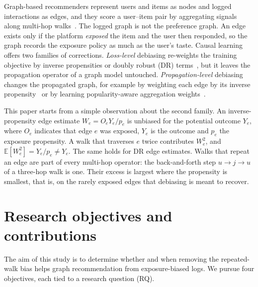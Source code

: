\documentclass[preprint,review,12pt,authoryear]{elsarticle}
\theoremstyle{definition}
\newcommand{\E}{\mathbb{E}}
\begin{document}
Graph-based recommenders represent users and items as nodes and logged
interactions as edges, and they score a user--item pair by aggregating signals
along multi-hop walks~\citep{he2020lightgcn,shen2021gfcf}. The logged graph is
not the preference graph. An edge exists only if the platform \emph{exposed}
the item and the user then responded, so the graph records the exposure policy
as much as the user's taste. Causal learning offers two families of
corrections. \emph{Loss-level} debiasing re-weights the training objective by
inverse propensities or doubly robust (DR)
terms~\citep{schnabel2016,wang2019drjl,saito2020unbiased}, but it leaves the
propagation operator of a graph model untouched. \emph{Propagation-level}
debiasing changes the propagated graph, for example by weighting each edge by
its inverse propensity~\citep{kim2022navip} or by learning popularity-aware
aggregation weights~\citep{zhou2023apda,dpaa2026}.

This paper starts from a simple observation about the second family. An
inverse-propensity edge estimate $W_e=O_eY_e/p_e$ is unbiased for the potential
outcome $Y_e$, where $O_e$ indicates that edge $e$ was exposed, $Y_e$ is the
outcome and $p_e$ the exposure propensity. A walk that traverses $e$ twice
contributes $W_e^2$, and $\E[W_e^2]=Y_e/p_e\neq Y_e$. The same holds for DR edge
estimates. Walks that repeat an edge are part of every multi-hop operator: the
back-and-forth step $u\to j\to u$ of a three-hop walk is one. Their excess is
largest where the propensity is smallest, that is, on the rarely exposed edges
that debiasing is meant to recover.

\section{Research objectives and contributions}\label{sec:objectives}

The aim of this study is to determine whether and when removing the
repeated-walk bias helps graph recommendation from exposure-biased logs. We
pursue four objectives, each tied to a research question (RQ).
\end{document}
